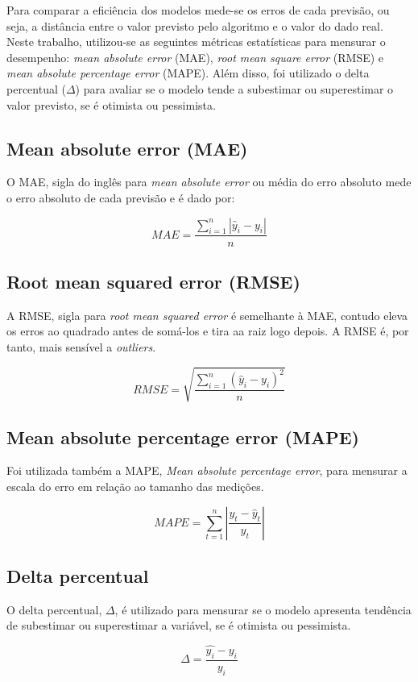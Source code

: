     Para comparar a eficiência dos modelos mede-se os erros de 
    cada previsão, ou seja, a distância entre o valor previsto 
    pelo algoritmo e o valor do dado real. Neste trabalho, 
    utilizou-se as seguintes métricas estatísticas para 
    mensurar o desempenho: \textit{mean absolute error} (MAE),
    \textit{root mean square  error} (RMSE) e \textit{mean 
    absolute percentage error} (MAPE). Além disso, foi utilizado
    o delta percentual ($\Delta$) para avaliar se o modelo tende 
    a subestimar ou superestimar o valor previsto, se é otimista
    ou pessimista.

\subsection{Mean absolute error (MAE)}

    O MAE, sigla do inglês para \textit{mean absolute error}
    ou média do erro absoluto mede o erro absoluto de cada previsão
    e é dado por:\cite{forecast-evaluation-ds}

    \begin{equation}
        MAE = \frac{\sum_{i=1}^n |\hat{y}_i - y_i|}{n}
    \end{equation}

\subsection{Root mean squared error (RMSE)}

    A RMSE, sigla para \textit{root mean squared  error} é
    semelhante à MAE, contudo eleva os erros ao quadrado antes de 
    somá-los e tira aa raiz logo depois. A RMSE é, por tanto, 
    mais sensível a \textit{outliers}.\cite{forecast-evaluation-ds}

    \begin{equation}
        RMSE = \sqrt{\frac{\sum_{i=1}^n (\hat{y}_i - y_i)^2}{n}}
    \end{equation}

\subsection{Mean absolute percentage error (MAPE)}

    Foi utilizada também a MAPE, \textit{Mean absolute
    percentage error}, para mensurar a escala do erro em 
    relação ao tamanho das medições.

    \begin{equation}
        MAPE=\sum_{t=1}^n\left|\frac{y_t-\hat{y}_t}{y_t}\right|
    \end{equation}

\subsection{Delta percentual}

O delta percentual, $\Delta$, é utilizado para mensurar se o 
modelo apresenta tendência de subestimar ou superestimar a variável, se 
é otimista ou pessimista.

\begin{equation}
    \Delta = \frac{\hat{y_i} - y_i}{y_i}
\end{equation}